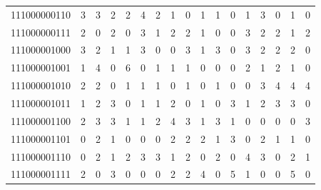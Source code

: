 \documentclass[10pt,a4paper]{article}
\begin{document}
\begin{longtable}{ |c|c|c|c|c|c|c|c|c|c|c|c|c|c|c|c|c| }
    111000000110              & 3                            & 3                                & 2                            & 2                              & 4   & 2   & 1   & 0   & 1   & 1   & 0   & 1   & 3   & 0   & 1   & 0   \\
    111000000111              & 2                            & 0                                & 2                            & 0                              & 3   & 1   & 2   & 2   & 1   & 0   & 0   & 3   & 2   & 2   & 1   & 2   \\
    111000001000              & 3                            & 2                                & 1                            & 1                              & 3   & 0   & 0   & 3   & 1   & 3   & 0   & 3   & 2   & 2   & 2   & 0   \\
    111000001001              & 1                            & 4                                & 0                            & 6                              & 0   & 1   & 1   & 1   & 0   & 0   & 0   & 2   & 1   & 2   & 1   & 0   \\
    111000001010              & 2                            & 2                                & 0                            & 1                              & 1   & 1   & 0   & 1   & 0   & 1   & 0   & 0   & 3   & 4   & 4   & 4   \\
    111000001011              & 1                            & 2                                & 3                            & 0                              & 1   & 1   & 2   & 0   & 1   & 0   & 3   & 1   & 2   & 3   & 3   & 0   \\
    111000001100              & 2                            & 3                                & 3                            & 1                              & 1   & 2   & 4   & 3   & 1   & 3   & 1   & 0   & 0   & 0   & 0   & 3   \\
    111000001101              & 0                            & 2                                & 1                            & 0                              & 0   & 0   & 2   & 2   & 2   & 1   & 3   & 0   & 2   & 1   & 1   & 0   \\
    111000001110              & 0                            & 2                                & 1                            & 2                              & 3   & 3   & 1   & 2   & 0   & 2   & 0   & 4   & 3   & 0   & 2   & 1   \\
    111000001111              & 2                            & 0                                & 3                            & 0                              & 0   & 0   & 2   & 2   & 4   & 0   & 5   & 1   & 0   & 0   & 5   & 0   \\

\end{longtable}
\end{document}
